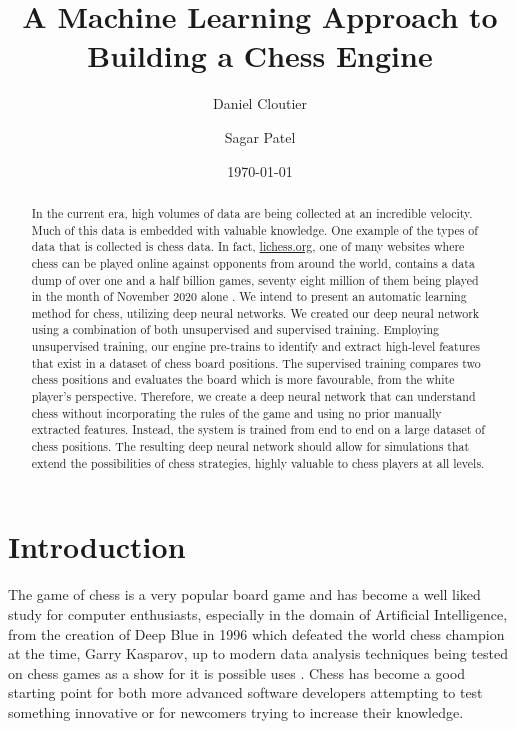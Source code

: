\documentclass[12pt]{article}
\title{A Machine Learning Approach to Building a Chess Engine}
\author{Daniel Cloutier \and Sagar Patel}
\date{\today}
\begin{document}
    \begin{singlespace}
        \maketitle 
    \end{singlespace}

    \tableofcontents

    \clearpage

    \begin{abstract}
        In the current era, high volumes of data are being collected at an incredible velocity. Much of this data is embedded with valuable knowledge. \cite{main} One example of the types of data that is collected is chess data. In fact, \href{https://lichess.org/}{lichess.org}, one of many websites where chess can be played online against opponents from around the world, contains a data dump of over one and a half billion games, seventy eight million of them being played in the month of November 2020 alone \cite{lichessdb}. We intend to present an automatic learning method for chess, utilizing deep neural networks. We created our deep neural network using a combination of both unsupervised and supervised training. Employing unsupervised training, our engine pre-trains to identify and extract high-level features that exist in a dataset of chess board positions. The supervised training compares two chess positions and evaluates the board which is more favourable, from the white player's perspective. Therefore, we create a deep neural network that can understand chess without incorporating the rules of the game and using no prior manually extracted features. Instead, the system is trained from end to end on a large dataset of chess positions. The resulting deep neural network should allow for simulations that extend the possibilities of chess strategies, highly valuable to chess players at all levels.
    \end{abstract}
        
    \section{Introduction}
    The game of chess is a very popular board game and has become a well liked study for computer enthusiasts, especially in the domain of Artificial Intelligence, from the creation of Deep Blue in 1996 which defeated the world chess champion at the time, Garry Kasparov, up to modern data analysis techniques being tested on chess games as a show for it is possible uses \cite{maiachess}\cite{piece_values}\cite{alphazero}. Chess has become a good starting point for both more advanced software developers attempting to test something innovative or for newcomers trying to increase their knowledge. 
\end{document}
